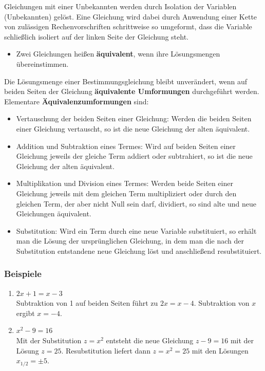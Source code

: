 Gleichungen mit einer Unbekannten werden durch Isolation der Variablen (Unbekannten) gelöst. Eine Gleichung wird dabei durch Anwendung einer Kette von zulässigen Rechenvorschriften schrittweise so umgeformt, dass die Variable schließlich isoliert auf der linken Seite der Gleichung steht.
\begin{itemize}
  \item Zwei Gleichungen heißen \textbf{äquivalent}, wenn ihre Lösungsmengen übereinstimmen.
\end{itemize}

Die Lösungsmenge einer Bestimmungsgleichung bleibt unverändert, wenn auf beiden Seiten der Gleichung \textbf{äquivalente Umformungen} durchgeführt werden. Elementare \textbf{Äquivalenzumformungen} sind:
\begin{itemize}
  \item Vertauschung der beiden Seiten einer Gleichung: Werden die beiden Seiten einer Gleichung vertauscht, so ist die neue Gleichung der alten äquivalent.
  \item Addition und Subtraktion eines Termes: Wird auf beiden Seiten einer Gleichung jeweils der gleiche Term addiert oder subtrahiert, so ist die neue Gleichung der alten äquivalent.
  \item Multiplikation und Division eines Termes: Werden beide Seiten einer Gleichung jeweils mit dem gleichen Term multipliziert oder durch den gleichen Term, der aber nicht Null sein darf, dividiert, so sind alte und neue Gleichungen äquivalent.
  \item Substitution: Wird ein Term durch eine neue Variable substituiert, so erhält man die Lösung der ursprünglichen Gleichung, in dem man die nach der Substitution entstandene neue Gleichung löst und anschließend resubstituiert.
\end{itemize}

\subsubsection{Beispiele}

\begin{enumerate}[label=\alph*)]
  \item $2x + 1 = x - 3$\\
    Subtraktion von 1 auf beiden Seiten führt zu $2x = x - 4$. Subtraktion von $x$ ergibt $x = -4$.
  \item $x^2 - 9 = 16$\\
    Mit der Substitution $z = x^2$ entsteht die neue Gleichung $z - 9 = 16$ mit der Lösung $z = 25$. Resubstitution liefert dann $z = x^2 = 25$ mit den Lösungen $x_{1/2} = \pm 5$.\beispielende
\end{enumerate}

